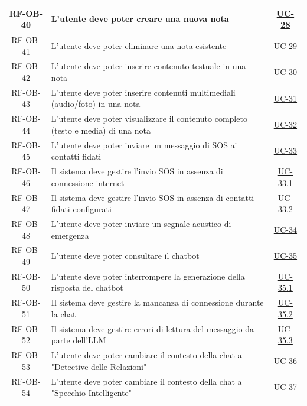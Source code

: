 \documentclass[a4paper,12pt]{article}
\begin{document}
\begin{center}
\begin{longtable}{|c|p{9cm}|c|}
\hline
\rowcolor{gray!20}
RF-OB-40 & L'utente deve poter creare una nuova nota & \hyperref[subsec:UC-28]{UC-28} \\
\hline
\rowcolor{white}
RF-OB-41 & L'utente deve poter eliminare una nota esistente & \hyperref[subsec:UC-29]{UC-29} \\
\hline
\rowcolor{gray!20}
RF-OB-42 & L'utente deve poter inserire contenuto testuale in una nota & \hyperref[subsec:UC-30]{UC-30} \\
\hline
\rowcolor{white}
RF-OB-43 & L'utente deve poter inserire contenuti multimediali (audio/foto) in una nota & \hyperref[subsec:UC-31]{UC-31} \\
\hline
\rowcolor{gray!20}
RF-OB-44 & L'utente deve poter visualizzare il contenuto completo (testo e media) di una nota & \hyperref[subsec:UC-32]{UC-32} \\
\hline
\rowcolor{white}
RF-OB-45 & L'utente deve poter inviare un messaggio di SOS ai contatti fidati & \hyperref[sec:UC-33]{UC-33} \\
\hline
\rowcolor{gray!20}
RF-OB-46 & Il sistema deve gestire l'invio SOS in assenza di connessione internet & \hyperref[sec:UC-33.1]{UC-33.1} \\
\hline
\rowcolor{white}
RF-OB-47 & Il sistema deve gestire l'invio SOS in assenza di contatti fidati configurati & \hyperref[sec:UC-33.2]{UC-33.2} \\
\hline
\rowcolor{gray!20}
RF-OB-48 & L'utente deve poter inviare un segnale acustico di emergenza & \hyperref[sec:UC-34]{UC-34} \\
\hline
\rowcolor{white}
RF-OB-49 & L'utente deve poter consultare il chatbot & \hyperref[sec:UC-35]{UC-35} \\
\hline
\rowcolor{gray!20}
RF-OB-50 & L'utente deve poter interrompere la generazione della risposta del chatbot & \hyperref[sec:UC-35.1]{UC-35.1} \\
\hline
\rowcolor{white}
RF-OB-51 & Il sistema deve gestire la mancanza di connessione durante la chat & \hyperref[sec:UC-35.2]{UC-35.2} \\
\hline
\rowcolor{gray!20}
RF-OB-52 & Il sistema deve gestire errori di lettura del messaggio da parte dell'LLM & \hyperref[sec:UC-35.3]{UC-35.3} \\
\hline
\rowcolor{white}
RF-OB-53 & L'utente deve poter cambiare il contesto della chat a "Detective delle Relazioni" & \hyperref[sec:UC-36]{UC-36} \\
\hline
\rowcolor{gray!20}
RF-OB-54 & L'utente deve poter cambiare il contesto della chat a "Specchio Intelligente" & \hyperref[sec:UC-37]{UC-37} \\

\end{longtable}
\end{center}
\end{document}

